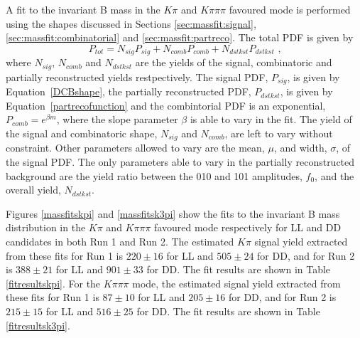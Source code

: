A fit to the invariant B mass in the $K\pi$ and $K\pi\pi\pi$ favoured mode is performed using the shapes discussed in Sections \ref{sec:massfit:signal}, \ref{sec:massfit:combinatorial} and \ref{sec:massfit:partreco}. The total PDF is given by
\begin{equation}
P_{tot} = N_{sig}P_{sig} + N_{comb}P_{comb} + N_{dstkst}P_{dstkst} \text{ ,}
\end{equation}
where $N_{sig}$, $N_{comb}$ and $N_{dstkst}$ are the yields of the signal, combinatoric and partially reconstructed yields restpectively. The signal PDF, $P_{sig}$, is given by Equation~\ref{DCBshape}, the partially reconstructed PDF, $P_{dstkst}$, is given by Equation~\ref{partrecofunction} and the combintorial PDF is an exponential, $P_{comb} = e^{\beta m}$, where the slope parameter $\beta$ is able to vary in the fit. The yield of the signal and combinatoric shape, $N_{sig}$ and $N_{comb}$, are left to vary without constraint. Other parameters allowed to vary are the mean, $\mu$, and width, $\sigma$, of the signal PDF. The only parameters able to vary in the partially reconstructed background are the yield ratio between the 010 and 101 amplitudes, $f_0$, and the overall yield, $N_{dstkst}$.

Figures \ref{massfitskpi} and \ref{massfitsk3pi} show the fits to the invariant B mass distribution in the $K\pi$ and $K\pi\pi\pi$ favoured mode respectively for LL and DD candidates in both Run 1 and Run 2. The estimated $K\pi$ signal yield extracted from these fits for Run 1 is $220 \pm 16$ for LL and $505 \pm 24$ for DD, and for Run 2 is $388 \pm 21$ for LL and $901 \pm 33$ for DD. The fit results are shown in Table \ref{fitresultskpi}. For the $K\pi\pi\pi$ mode, the estimated signal yield extracted from these fits for Run 1 is $87 \pm 10$ for LL and $205 \pm 16$ for DD, and for Run 2 is $215 \pm 15$ for LL and $516 \pm 25$ for DD. The fit results are shown in Table \ref{fitresultsk3pi}.

